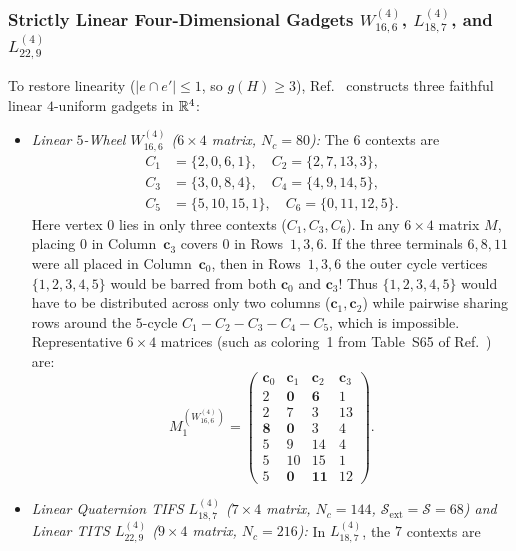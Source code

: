 \documentclass[aps,pra,reprint,superscriptaddress,longbibliography,nofootinbib,floatfix,10pt]{revtex4-2}
\theoremstyle{definition}\newtheorem{definition}[theorem]{Definition}
\theoremstyle{remark}\newtheorem{remark}[theorem]{Remark}
\newcommand{\Sc}{\mathcal S}\newcommand{\Cc}{\mathcal C}
\begin{document}
\subsubsection{Strictly Linear Four-Dimensional Gadgets \texorpdfstring{$W_{16,6}^{(4)}$, $L_{18,7}^{(4)}$, and $L_{22,9}^{(4)}$}{W16,6(4), L18,7(4), and L22,9(4)}}
To restore linearity ($|e\cap e'|\le 1$, so $g(H)\ge 3$), Ref.~\cite{svozil-2025-color} constructs three faithful linear $4$-uniform gadgets in $\mathbb R^4$:
\begin{itemize}
\item \emph{Linear $5$-Wheel $W_{16,6}^{(4)}$ ($6\times 4$ matrix, $N_c=80$):} The $6$ contexts are
\[
\begin{aligned}
C_1&=\{2,0,6,1\},\quad C_2=\{2,7,13,3\},\\
C_3&=\{3,0,8,4\},\quad C_4=\{4,9,14,5\},\\
C_5&=\{5,10,15,1\},\quad C_6=\{0,11,12,5\}.
\end{aligned}
\]
Here vertex $0$ lies in only three contexts ($C_1,C_3,C_6$). In any $6\times 4$ matrix $M$, placing $0$ in Column~$\mathbf{c}_3$ covers $0$ in Rows~$1,3,6$. If the three terminals $6,8,11$ were all placed in Column~$\mathbf{c}_0$, then in Rows~$1,3,6$ the outer cycle vertices $\{1,2,3,4,5\}$ would be barred from both $\mathbf{c}_0$ and $\mathbf{c}_3$! Thus $\{1,2,3,4,5\}$ would have to be distributed across only two columns ($\mathbf{c}_1,\mathbf{c}_2$) while pairwise sharing rows around the $5$-cycle $C_1-C_2-C_3-C_4-C_5$, which is impossible. Representative $6\times 4$ matrices (such as coloring~1 from Table~S65 of Ref.~\cite{supplement}) are:
\begin{equation}\label{eq:W16-matrix}
M_1^{(W_{16,6}^{(4)})}=\begin{pmatrix}
\mathbf{c}_0 & \mathbf{c}_1 & \mathbf{c}_2 & \mathbf{c}_3\\\hline
2 & \mathbf{0} & \mathbf{6} & 1\\
2 & 7 & 3 & 13\\
\mathbf{8} & \mathbf{0} & 3 & 4\\
5 & 9 & 14 & 4\\
5 & 10 & 15 & 1\\
5 & \mathbf{0} & \mathbf{11} & 12
\end{pmatrix}.
\end{equation}
\item \emph{Linear Quaternion TIFS $L_{18,7}^{(4)}$ ($7\times 4$ matrix, $N_c=144$, $\Sc_{\mathrm{ext}}=\Sc=68$) and Linear TITS $L_{22,9}^{(4)}$ ($9\times 4$ matrix, $N_c=216$):} In $L_{18,7}^{(4)}$, the $7$ contexts are

\end{itemize}
\end{document}
